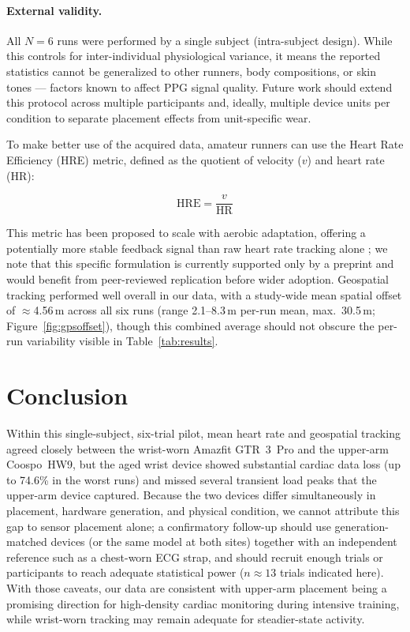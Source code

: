 \documentclass{acmsiggraph}
\begin{document}
\paragraph{External validity.} All $N=6$ runs were performed by a single
subject (intra-subject design). While this controls for
inter-individual physiological variance, it means the reported
statistics cannot be generalized to other runners, body compositions, or
skin tones --- factors known to affect PPG signal quality. Future work
should extend this protocol across multiple participants and, ideally,
multiple device units per condition to separate placement effects from
unit-specific wear.

To make better use of the acquired data, amateur runners can use the
Heart Rate Efficiency (HRE) metric, defined as the quotient of velocity
($v$) and heart rate (HR):

\begin{equation}
\mathrm{HRE} = \frac{v}{\mathrm{HR}}
\label{eq:hre}
\end{equation}

This metric has been proposed to scale with aerobic adaptation, offering
a potentially more stable feedback signal than raw heart rate tracking
alone \cite{Votyakov2025}; we note that this specific formulation is
currently supported only by a preprint and would benefit from
peer-reviewed replication before wider adoption. Geospatial tracking
performed well overall in our data, with a study-wide mean spatial
offset of $\approx$4.56\,m across all six runs (range 2.1--8.3\,m
per-run mean, max.\ 30.5\,m; Figure~\ref{fig:gpsoffset}), though this
combined average should not obscure the per-run variability visible in
Table~\ref{tab:results}.

\section{Conclusion}

Within this single-subject, six-trial pilot, mean heart rate and
geospatial tracking agreed closely between the wrist-worn Amazfit GTR~3~Pro
and the upper-arm Coospo~HW9, but the aged wrist device showed
substantial cardiac data loss (up to 74.6\% in the worst runs) and
missed several transient load peaks that the upper-arm device captured.
Because the two devices differ simultaneously in placement, hardware
generation, and physical condition, we cannot attribute this gap to
sensor placement alone; a confirmatory follow-up should use
generation-matched devices (or the same model at both sites) together
with an independent reference such as a chest-worn ECG strap, and should
recruit enough trials or participants to reach adequate statistical
power ($n\approx13$ trials indicated here). With those caveats, our data
are consistent with upper-arm placement being a promising direction for
high-density cardiac monitoring during intensive training, while
wrist-worn tracking may remain adequate for steadier-state activity.
\end{document}
